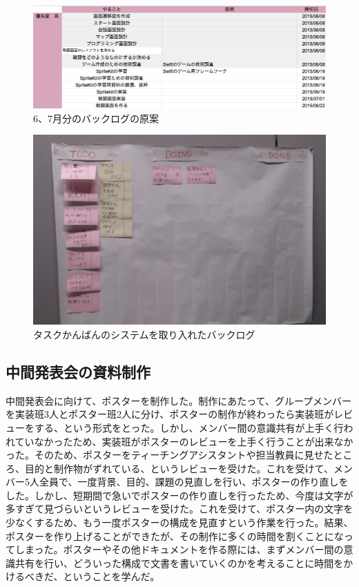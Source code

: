 \documentclass[openany,11pt,papersize]{jsbook}
\begin{document}
\begin{figure}[H]
\begin{center}
\includegraphics[width=14cm, bb=0 0 1020 359]{img/SprintBacklog.png}
\end{center}
\caption{6、7月分のバックログの原案}
\end{figure}

\begin{figure}[H]
\begin{center}
\includegraphics[width=14cm, bb=0 0 1206 783]{img/TaskKanban.png}
\end{center}
\caption{タスクかんばんのシステムを取り入れたバックログ}
\end{figure}


\subsection{中間発表会の資料制作}
\par 中間発表会に向けて、ポスターを制作した。制作にあたって、グループメンバーを実装班3人とポスター班2人に分け、ポスターの制作が終わったら実装班がレビューをする、という形式をとった。しかし、メンバー間の意識共有が上手く行われていなかったため、実装班がポスターのレビューを上手く行うことが出来なかった。そのため、ポスターをティーチングアシスタントや担当教員に見せたところ、目的と制作物がずれている、というレビューを受けた。これを受けて、メンバー5人全員で、一度背景、目的、課題の見直しを行い、ポスターの作り直しをした。しかし、短期間で急いでポスターの作り直しを行ったため、今度は文字が多すぎて見づらいというレビューを受けた。これを受けて、ポスター内の文字を少なくするため、もう一度ポスターの構成を見直すという作業を行った。結果、ポスターを作り上げることができたが、その制作に多くの時間を割くことになってしまった。ポスターやその他ドキュメントを作る際には、まずメンバー間の意識共有を行い、どういった構成で文書を書いていくのかを考えることに時間をかけるべきだ、ということを学んだ。
\end{document}
